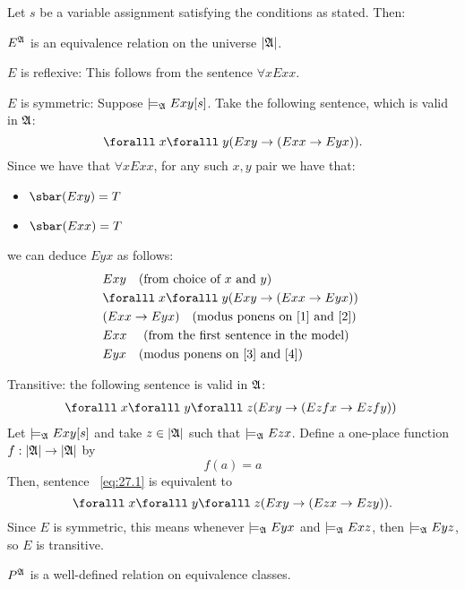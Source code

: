 \begin{Answer}
  Let $s$ be a variable assignment satisfying the conditions as stated.
  Then:
  \step
  \begin{enumalph}
    \item $E^{\mathfrak{A}}$ is an equivalence relation on the universe $\lvert\mathfrak{A}\rvert$.
      \begin{enumroman}
        \item $E$ is reflexive: This follows from the sentence $\forall x Exx$.
        \item $E$ is symmetric:
          Suppose $\models_{\mathfrak{A}} Exy [s]$.
          Take the following sentence, which is valid in $\mathfrak{A}$:
          \[ \forall x \forall y (Exy \lto (Exx \lto Eyx)). \]
          Since we have that $\forall x Exx$,
          for any such $x, y$ pair we have that:
          \begin{itemize}
            \item $\sbar(Exy) = T$
            \item $\sbar(Exx) = T$
          \end{itemize}
          we can deduce $Eyx$ as follows:
          \begin{align}
            &Exy \quad \text{(from choice of $x$ and $y$)} ~\label{1} \\
            &\forall x \forall y (Exy \lto (Exx \lto Eyx)) ~\label{2} \\
            &(Exx \lto Eyx) \quad \text{(modus ponens on ~\ref{1} and ~\ref{2})} ~\label{3} \\
            &Exx ~\label{4} \quad \text{(from the first sentence in the model)}\\
            &Eyx  \quad \text{(modus ponens on ~\ref{3} and ~\ref{4})} ~\label{5}
          \end{align}
        \item Transitive:
          the following sentence is valid in $\mathfrak{A}$:
          \begin{align}
            \forall x \forall y \forall z (Exy \lto (Ez fx \lto Ez fy))~\label{eq:27.1}
          \end{align}
          \step
          Let $\models_{\mathfrak{A}} Exy [s]$ and take $z \in \lvert\mathfrak{A}\rvert$
          such that $\models_{\mathfrak{A}} Ezx$.
          Define a one-place function $f : \lvert\mathfrak{A}\rvert \to \lvert\mathfrak{A}\rvert$ by
          \[ f(a) = a \]
          Then, sentence ~\ref{eq:27.1} is equivalent to
          \[ \forall x \forall y \forall z (Exy \lto (Ezx \lto Ezy)). \]
          Since $E$ is symmetric, this means whenever $\models_{\mathfrak{A}} Eyx$ and
          $\models_{\mathfrak{A}} Exz$, then $\models_{\mathfrak{A}} Eyz$, so $E$ is transitive.
      \end{enumroman}
    \item $P^{\mathfrak{A}}$ is a well-defined relation on equivalence classes.
    

\end{enumalph}
\end{Answer}
